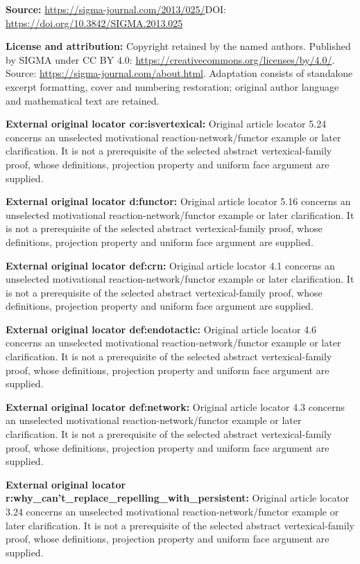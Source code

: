 \documentclass[11pt]{article}
\begin{document}
\noindent\textbf{Source:} \url{https://sigma-journal.com/2013/025/}\quad DOI: \url{https://doi.org/10.3842/SIGMA.2013.025}\par
\noindent\textbf{License and attribution:} Copyright retained by the named authors. Published by SIGMA under CC BY 4.0: \url{https://creativecommons.org/licenses/by/4.0/}. Source: \url{https://sigma-journal.com/about.html}. Adaptation consists of standalone excerpt formatting, cover and numbering restoration; original author language and mathematical text are retained.\par
\noindent\textbf{External original locator cor:isvertexical:} Original article locator 5.24 concerns an unselected motivational reaction-network/functor example or later clarification. It is not a prerequisite of the selected abstract vertexical-family proof, whose definitions, projection property and uniform face argument are supplied.\par
\noindent\textbf{External original locator d:functor:} Original article locator 5.16 concerns an unselected motivational reaction-network/functor example or later clarification. It is not a prerequisite of the selected abstract vertexical-family proof, whose definitions, projection property and uniform face argument are supplied.\par
\noindent\textbf{External original locator def:crn:} Original article locator 4.1 concerns an unselected motivational reaction-network/functor example or later clarification. It is not a prerequisite of the selected abstract vertexical-family proof, whose definitions, projection property and uniform face argument are supplied.\par
\noindent\textbf{External original locator def:endotactic:} Original article locator 4.6 concerns an unselected motivational reaction-network/functor example or later clarification. It is not a prerequisite of the selected abstract vertexical-family proof, whose definitions, projection property and uniform face argument are supplied.\par
\noindent\textbf{External original locator def:network:} Original article locator 4.3 concerns an unselected motivational reaction-network/functor example or later clarification. It is not a prerequisite of the selected abstract vertexical-family proof, whose definitions, projection property and uniform face argument are supplied.\par
\noindent\textbf{External original locator r:why\_can't\_replace\_repelling\_with\_persistent:} Original article locator 3.24 concerns an unselected motivational reaction-network/functor example or later clarification. It is not a prerequisite of the selected abstract vertexical-family proof, whose definitions, projection property and uniform face argument are supplied.\par
\end{document}
